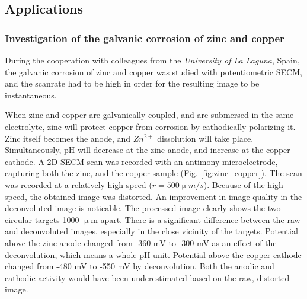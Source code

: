		\subsection{Applications}
			\subsubsection{Investigation of the galvanic corrosion of zinc and copper}
During the cooperation with colleagues from the \emph{University of La Laguna}, Spain, the galvanic corrosion of zinc and copper was studied with potentiometric SECM, and the scanrate had to be high in order for the resulting image to be instantaneous. 

When zinc and copper are galvanically coupled, and are submersed in the same electrolyte, zinc will protect copper from corrosion by cathodically polarizing it.
Zinc itself becomes the anode, and $Zn^{2+}$ dissolution will take place.
Simultaneously, pH will decrease at the zinc anode, and increase at the copper cathode.
A 2D SECM scan was recorded with an antimony microelectrode, capturing both the zinc, and the copper sample (Fig. \ref{fig:zinc_copper}).
The scan was recorded at a relatively high speed ($r = 500 \upmu m/s$).
Because of the high speed, the obtained image was distorted.
An improvement in image quality in the deconvoluted image is noticable.
The processed image clearly shows the two circular targets 1000 $\upmu$m apart.
There is a significant difference between the raw and deconvoluted images, especially in the close vicinity of the targets.
Potential above the zinc anode changed from -360 mV to -300 mV as an effect of the deconvolution, which means a whole pH unit.
Potential above the copper cathode changed from -480 mV to -550 mV by deconvolution.
Both the anodic and cathodic activity would have been underestimated based on the raw, distorted image.

